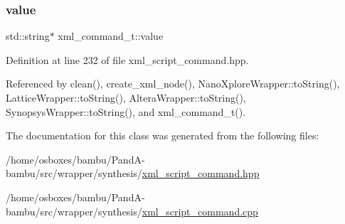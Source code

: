 \mbox{\label{classxml__command__t_a75f61b7710a747e84711154c91966177}} 
\subsubsection{\texorpdfstring{value}{value}}
{\footnotesize\ttfamily std\+::string$\ast$ xml\+\_\+command\+\_\+t\+::value}



Definition at line 232 of file xml\+\_\+script\+\_\+command.\+hpp.



Referenced by clean(), create\+\_\+xml\+\_\+node(), Nano\+Xplore\+Wrapper\+::to\+String(), Lattice\+Wrapper\+::to\+String(), Altera\+Wrapper\+::to\+String(), Synopsys\+Wrapper\+::to\+String(), and xml\+\_\+command\+\_\+t().



The documentation for this class was generated from the following files\+:\begin{DoxyCompactItemize}
\item 
/home/osboxes/bambu/\+Pand\+A-\/bambu/src/wrapper/synthesis/\hyperlink{xml__script__command_8hpp}{xml\+\_\+script\+\_\+command.\+hpp}\item 
/home/osboxes/bambu/\+Pand\+A-\/bambu/src/wrapper/synthesis/\hyperlink{xml__script__command_8cpp}{xml\+\_\+script\+\_\+command.\+cpp}\end{DoxyCompactItemize}
